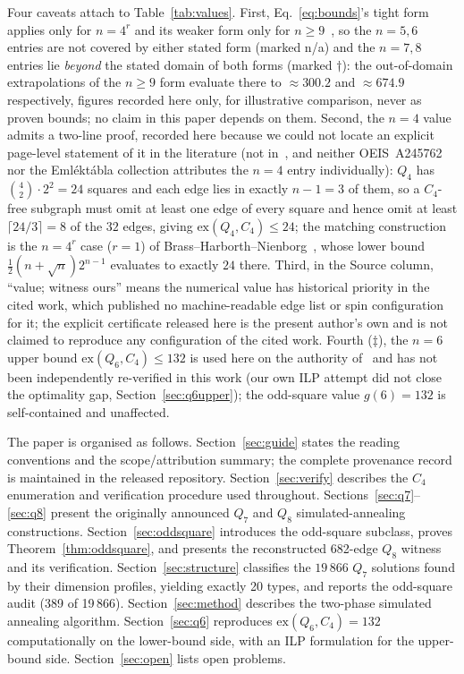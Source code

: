 \documentclass[12pt]{article}
\newcommand{\ex}{\mathrm{ex}}
\begin{document}
Four caveats attach to Table~\ref{tab:values}. First,
Eq.~\eqref{eq:bounds}'s tight form applies only for $n=4^r$ and its weaker
form only for $n\ge9$~\cite{BHN95}, so the $n=5,6$ entries are not covered
by either stated form (marked n/a) and the $n=7,8$ entries lie \emph{beyond}
the stated domain of both forms (marked $\dagger$): the out-of-domain
extrapolations of the $n\ge9$ form evaluate there to $\approx300.2$ and
$\approx674.9$ respectively, figures recorded here only, for illustrative
comparison, never as proven bounds; no claim in this paper depends on them.
Second, the $n=4$ value admits a two-line proof, recorded here because we
could not locate an explicit page-level statement of it in the literature
(not in~\cite{Chu92}, and neither OEIS~A245762 nor the Emléktábla
collection attributes the $n=4$ entry individually): $Q_4$ has
$\binom42\cdot2^2=24$ squares and each edge lies in exactly $n-1=3$ of
them, so a $C_4$-free subgraph must omit at least one edge of every square
and hence omit at least $\lceil24/3\rceil=8$ of the $32$ edges, giving
$\ex(Q_4,C_4)\le24$; the matching construction is the $n=4^r$ case
($r=1$) of Brass--Harborth--Nienborg~\cite{BHN95}, whose lower bound
$\tfrac12(n+\sqrt n)2^{n-1}$ evaluates to exactly $24$ there. Third, in the Source column, ``value; witness ours''
means the numerical value has historical priority in the cited work, which
published no machine-readable edge list or spin configuration for it; the
explicit certificate released here is the present author's own and is not
claimed to reproduce any configuration of the cited work. Fourth
($\ddagger$), the $n=6$ upper bound $\ex(Q_6,C_4)\le132$ is used here on
the authority of~\cite{HN94} and has not been independently re-verified in
this work (our own ILP attempt did not close the optimality gap,
Section~\ref{sec:q6upper}); the odd-square value $g(6)=132$ is
self-contained and unaffected.

The paper is organised as follows.
Section~\ref{sec:guide} states the reading conventions and the
scope/attribution summary; the complete provenance record is maintained
in the released repository.
Section~\ref{sec:verify} describes the $C_4$ enumeration and verification
procedure used throughout.
Sections~\ref{sec:q7}--\ref{sec:q8} present the originally announced $Q_7$
and $Q_8$ simulated-annealing constructions.
Section~\ref{sec:oddsquare} introduces the odd-square subclass, proves
Theorem~\ref{thm:oddsquare}, and presents the reconstructed 682-edge $Q_8$
witness and its verification.
Section~\ref{sec:structure} classifies the $19\,866$ $Q_7$ solutions found
by their dimension profiles, yielding exactly 20 types, and reports the
odd-square audit (389 of 19\,866).
Section~\ref{sec:method} describes the two-phase simulated annealing algorithm.
Section~\ref{sec:q6} reproduces $\ex(Q_6,C_4)=132$ computationally on the
lower-bound side, with an ILP formulation for the upper-bound side.
Section~\ref{sec:open} lists open problems.
\end{document}
